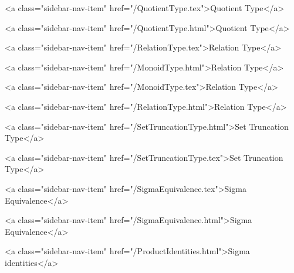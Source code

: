       
    
      
        
          <a class="sidebar-nav-item" href="/QuotientType.tex">Quotient Type</a>
        
      
    
      
        
          <a class="sidebar-nav-item" href="/QuotientType.html">Quotient Type</a>
        
      
    
      
        
          <a class="sidebar-nav-item" href="/RelationType.tex">Relation Type</a>
        
      
    
      
        
          <a class="sidebar-nav-item" href="/MonoidType.html">Relation Type</a>
        
      
    
      
        
          <a class="sidebar-nav-item" href="/MonoidType.tex">Relation Type</a>
        
      
    
      
        
          <a class="sidebar-nav-item" href="/RelationType.html">Relation Type</a>
        
      
    
      
        
          <a class="sidebar-nav-item" href="/SetTruncationType.html">Set Truncation Type</a>
        
      
    
      
        
          <a class="sidebar-nav-item" href="/SetTruncationType.tex">Set Truncation Type</a>
        
      
    
      
        
          <a class="sidebar-nav-item" href="/SigmaEquivalence.tex">Sigma Equivalence</a>
        
      
    
      
        
          <a class="sidebar-nav-item" href="/SigmaEquivalence.html">Sigma Equivalence</a>
        
      
    
      
        
          <a class="sidebar-nav-item" href="/ProductIdentities.html">Sigma identities</a>
        

